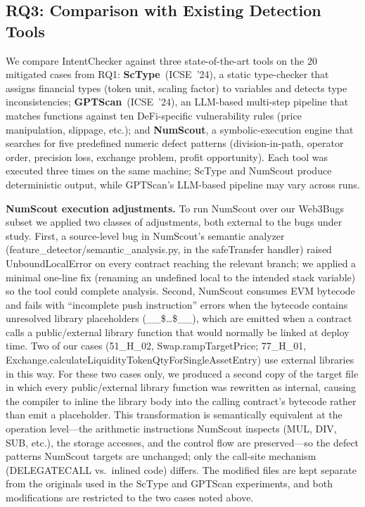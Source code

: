 \documentclass[pdflatex,sn-basic]{sn-jnl}%
\theoremstyle{thmstyleone}%
\theoremstyle{thmstyletwo}%
\theoremstyle{thmstylethree}%
\begin{document}
\subsection{RQ3: Comparison with Existing Detection Tools}\label{sec:rq3}

We compare IntentChecker against three state-of-the-art tools on the 20 mitigated cases from RQ1:
\textbf{ScType}~(ICSE~'24), a static type-checker that assigns financial types (token unit, scaling factor) to variables and detects type inconsistencies;
\textbf{GPTScan}~(ICSE~'24), an LLM-based multi-step pipeline that matches functions against ten DeFi-specific vulnerability rules (price manipulation, slippage, etc.); and
\textbf{NumScout}, a symbolic-execution engine that searches for five predefined numeric defect patterns (division-in-path, operator order, precision loss, exchange problem, profit opportunity).
Each tool was executed three times on the same machine; ScType and NumScout produce deterministic output, while GPTScan's LLM-based pipeline may vary across runs.

\smallskip
\noindent\textbf{NumScout execution adjustments.}
To run NumScout over our Web3Bugs subset we applied two classes of adjustments, both external to the bugs under study.
First, a source-level bug in NumScout's semantic analyzer (feature\_detector/semantic\_analysis.py, in the safeTransfer handler) raised UnboundLocalError on every contract reaching the relevant branch; we applied a minimal one-line fix (renaming an undefined local to the intended stack variable) so the tool could complete analysis.
Second, NumScout consumes EVM bytecode and fails with ``incomplete push instruction'' errors when the bytecode contains unresolved library placeholders (\_\_\$\ldots\$\_\_), which are emitted when a contract calls a public/external library function that would normally be linked at deploy time.
Two of our cases (51\_H\_02, Swap.rampTargetPrice; 77\_H\_01, Exchange.calculateLiquidityTokenQtyForSingleAssetEntry) use external libraries in this way.
For these two cases only, we produced a second copy of the target file in which every public/external library function was rewritten as internal, causing the compiler to inline the library body into the calling contract's bytecode rather than emit a placeholder.
This transformation is semantically equivalent at the operation level---the arithmetic instructions NumScout inspects (MUL, DIV, SUB, etc.), the storage accesses, and the control flow are preserved---so the defect patterns NumScout targets are unchanged; only the call-site mechanism (DELEGATECALL vs.\ inlined code) differs.
The modified files are kept separate from the originals used in the ScType and GPTScan experiments, and both modifications are restricted to the two cases noted above.
\end{document}
